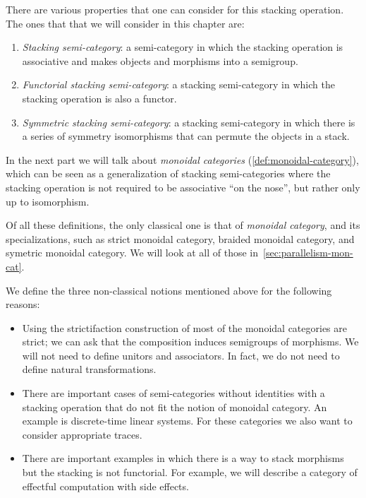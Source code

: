 There are various properties that one can consider for this stacking operation.
The ones that that we will consider in this chapter are:
%
\begin{enumerate}
    \item \emph{Stacking semi-category}: a semi-category in which the stacking operation is associative and makes objects and morphisms into a semigroup.
    \item \emph{Functorial stacking semi-category}: a stacking semi-category in which the stacking operation is also a functor.
    \item \emph{Symmetric stacking semi-category}: a stacking semi-category in which there is a series of symmetry isomorphisms that can permute the objects in a stack.
\end{enumerate}
%
In the next part we will talk about \emph{monoidal categories} (\cref{def:monoidal-category}), which can be seen as a generalization of stacking semi-categories where the stacking operation is not required to be associative ``on the nose'', but rather only up to isomorphism.

\begin{remark}
    Of all these definitions, the only classical one is that of \emph{monoidal category}, and its specializations, such as strict monoidal category, braided monoidal category, and symetric monoidal category.
    We will look at all of those in~\cref{sec:parallelism-mon-cat}.

    We define the three non-classical notions mentioned above for the following reasons:
    \begin{itemize}
        \item Using the strictifaction construction of \SetStar most of the monoidal categories are strict; we can ask that the composition induces semigroups of morphisms.
              We will not need to define unitors and associators.
              In fact, we do not need to define natural transformations.
        \item There are important cases of semi-categories without identities with a stacking operation that do not fit the notion of monoidal category.
              An example is discrete-time linear systems.
              For these categories we also want to consider appropriate traces.
        \item There are important examples in which there is a way to stack morphisms but the stacking is not functorial.
              For example, we will describe a category of effectful computation with side effects.
    \end{itemize}
\end{remark}

